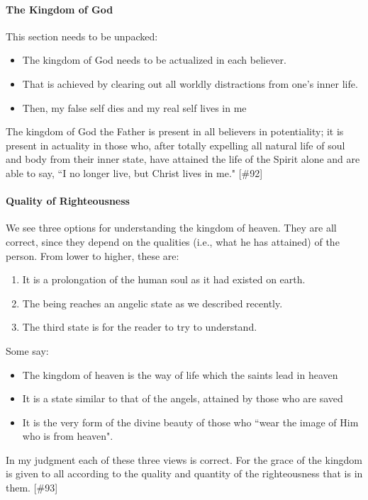\paragraph{The Kingdom of God}
This section needs to be unpacked:

\begin{itemize}
\item The kingdom of God needs to be actualized in each believer. 
\item That is achieved by clearing out all worldly distractions from one's inner life. 
\item Then, my false self dies and my real self lives in me 
\end{itemize}
\begin{quotex}
The kingdom of God the Father is present in all believers in potentiality; it is present in actuality in those who,
after totally expelling all natural life of soul and body from their inner state, have attained the life of the Spirit
alone and are able to say, ``I no longer live, but Christ lives in me." [\#92] 

\end{quotex}
\paragraph{Quality of Righteousness}
We see three options for understanding the kingdom of heaven. They are all correct, since they depend on the qualities
(i.e., what he has attained) of the person. From lower to higher, these are:

\begin{enumerate}
\item It is a prolongation of the human soul as it had existed on earth. 
\item The being reaches an angelic state as we described recently. 
\item The third state is for the reader to try to understand. 
\end{enumerate}
\begin{quotex}
Some say:

\end{quotex}
\begin{itemize}
\item \begin{quotex}
The kingdom of heaven is the way of life which the saints lead in heaven 
\end{quotex}
\item \begin{quotex}
It is a state similar to that of the angels, attained by those who are saved 
\end{quotex}
\item \begin{quotex}
It is the very form of the divine beauty of those who ``wear the image of Him who is from heaven". 
\end{quotex}
\end{itemize}
\begin{quotex}
In my judgment each of these three views is correct. For the grace of the kingdom is given to all according to the
quality and quantity of the righteousness that is in them. [\#93] 

\end{quotex}
